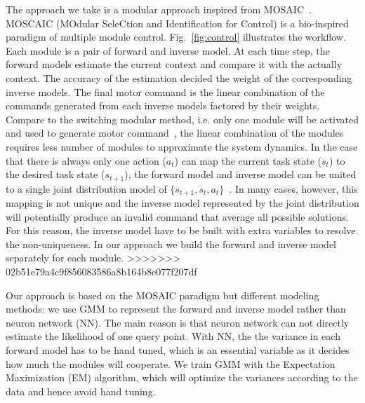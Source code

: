 The approach we take is a modular approach inspired from MOSAIC~\cite{haruno2001mosaic}. MOSCAIC (MOdular SeleCtion and Identification for Control) is a bio-inspired paradigm of multiple module control. Fig.~\ref{fig:control} illustrates the workflow. Each module is a pair of forward and inverse model. At each time step, the forward models estimate the current context and compare it with the actually context. The accuracy of the estimation decided the weight of the corresponding inverse models.
The final motor command is the linear combination of the commands generated from each inverse models factored by their weights. Compare to the switching modular method, i.e. only one module will be activated and used to generate motor command~\cite{narendra1997adaptive}, the linear combination of the modules requires less number of modules to approximate the system dynamics. In the case that there is always only one action ($a_t$) can map the current task state ($s_t$) to the desired task state ($s_{t+1}$), the forward model and inverse model can be united to a single joint distribution model of $\{s_{t+1}, s_t, a_t\}$~\cite{petkos2006learning}. In many cases, however, this mapping is not unique and the inverse model represented by the joint distribution will potentially produce an invalid command that average all possible solutions. For this reason, the inverse model have to be built with extra variables to resolve the non-uniqueness. In our approach we build the forward and inverse model separately for each module.
>>>>>>> 02b51e79a4c9f856083586a8b164b8e077f207df

Our approach is based on the MOSAIC paradigm but different modeling methods: we use GMM to represent the forward and inverse model rather than neuron network (NN). The main reason is that neuron network can not directly estimate the likelihood of one query point. With NN, the the variance in each forward model has to be hand tuned, which is an essential variable as it decides how much the modules will cooperate. We train GMM with the Expectation Maximization (EM) algorithm, which will optimize the variances according to the data and hence avoid hand tuning.

